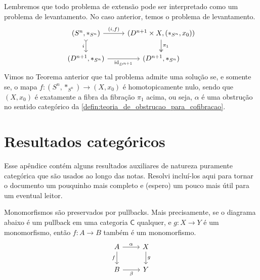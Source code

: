 Lembremos que todo problema de extensão pode ser interpretado como um problema de levantamento.
No caso anterior, temos o problema de levantamento.
\begin{displaymath}
  \begin{tikzcd}
    (S^{n},*_{S^{n}})
    \arrow[d, tail, "i" swap]
    \arrow[r, "{(i,f)}"]
    & (D^{n+1} \times X,(*_{S^{n}},x_{0}))
    \arrow[d, two heads, "\pi_{1}"]
    \\ (D^{n+1},*_{S^{n}})
    \arrow[r, "\id_{D^{n+1}}" swap]
    & (D^{n+1},*_{S^{n}})
  \end{tikzcd}
\end{displaymath}
Vimos no Teorema anterior que tal problema admite uma solução se, e somente se, o mapa $f: (S^{n},*_{S^{n}}) \to (X,x_{0})$ é homotopicamente nulo, sendo que $(X,x_{0})$ é exatamente a fibra da fibração $\pi_{1}$ acima, ou seja, $\alpha$ é uma obstrução no sentido categórico da \cref{defin:teoria_de_obstrucao_para_cofibracao}.

\appendix

\section{Resultados categóricos}

Esse apêndice contém alguns resultados auxiliares de natureza puramente categórica que são usados ao longo das notas.
Resolvi incluí-los aqui para tornar o documento um pouquinho mais completo e (espero) um pouco mais útil para um eventual leitor.

\begin{lema}\label{lema:pullback_de_mono_eh_mono}
  Monomorfismos são preservados por pullbacks.
  Mais precisamente, se o diagrama abaixo é um pullback em uma categoria $\mathsf{C}$ qualquer, e $g: X \to Y$ é um monomorfismo, então $f: A \to B$ também é um monomorfismo.
  \begin{displaymath}
    \begin{tikzcd}
      A
      \arrow[r, "\alpha"]
      \arrow[d, "f" swap]
      & X
      \arrow[d, "g"]
      \\ B
      \arrow[r, "\beta" swap]
      & Y
    \end{tikzcd}
  \end{displaymath}
\end{lema}

